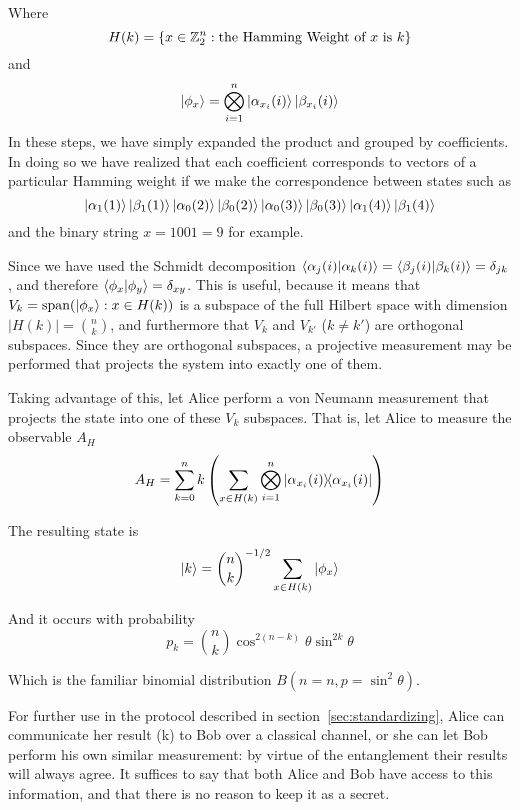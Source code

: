 Where 
$$
H(k) = \left\{ 
x \in \mathbb{Z}_2^n : \text{the Hamming Weight of $x$ is $k$} 
\right\}
$$
and
$$
\ket{\phi_x} = \bigotimes_{i=1}^n 
\ket{\alpha_{x_i}(i)} \ket{\beta_{x_i}(i)}
$$
In these steps, we have simply expanded the product and grouped by coefficients. In doing so we have realized that each coefficient corresponds to vectors of a particular Hamming weight if we make the correspondence between states such as
$$\ket{\alpha_1(1)} \ket{\beta_1(1)} \ket{\alpha_0(2)} \ket{\beta_0(2)} \ket{\alpha_0(3)} \ket{\beta_0(3)} \ket{\alpha_1(4)} \ket{\beta_1(4)}$$
and the binary string $x = 1001 = 9$ for example.

Since we have used the Schmidt decomposition $ \braket{\alpha_j(i)}{\alpha_k(i)} = \braket{\beta_j(i)}{\beta_k(i)} = \delta_{jk} $, and therefore $\braket{\phi_x}{\phi_y} = \delta_{xy}$.
This is useful, because it means that $V_k = \text{span}(\ket{\phi_x} : x \in H(k))$ is a subspace of the full Hilbert space with dimension $|H(k)| = \binom{n}{k}$, and furthermore that $V_k$ and $V_{k'}$ ($k\neq k'$) are orthogonal subspaces.
Since they are orthogonal subspaces, a projective measurement may be performed that projects the system into exactly one of them.

Taking advantage of this, let Alice perform a von Neumann measurement that projects the state into one of these $V_k$ subspaces. That is, let Alice to measure the observable $A_H$
$$
A_H = \sum_{k=0}^n k \left( \sum_{x \in H(k)}  
\bigotimes_{i=1}^n \dyad{\alpha_{x_i}(i)}{\alpha_{x_i}(i)}
\right) 
$$

The resulting state is
\begin{equation}
\label{eqn:kstate}
\ket{k} = \binom{n}{k}^{-1/2} \sum_{x \in H(k)} \ket{\phi_x}
\end{equation}

And it occurs with probability
\begin{equation}
\label{eqn:pk}
p_k = \binom{n}{k} \cos^{2(n-k)}\theta \sin^{2k}\theta
\end{equation}

Which is the familiar binomial distribution $B(n=n, p=\sin^2\theta)$.

For further use in the protocol described in section~\ref{sec:standardizing}, Alice can communicate her result (k) to Bob over a classical channel, or she can let Bob perform his own similar measurement: by virtue of the entanglement their results will always agree. It suffices to say that both Alice and Bob have access to this information, and that there is no reason to keep it as a secret.


